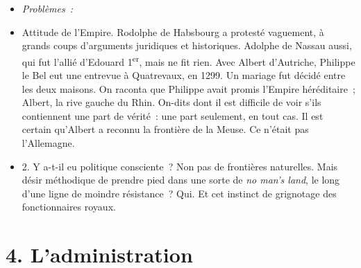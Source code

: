 \documentclass[french,twoside]{book} %
\newlength{\listmod}
\newcommand{\listhead}[1]{\hspace{-1\listmod}\emph{#1}}
\newcommand\chapteropen{} %
\newcommand\chaptercont{} %
\newcommand\chapterclose{} %
\begin{document}
\begin{enumerate}[itemsep=\baselineskip,]
\begin{itemize}[itemsep=0pt,]
\item[]\listhead{Problèmes :}
\item Attitude de l’Empire. Rodolphe de Habsbourg a protesté vaguement, à grands coups d’arguments juridiques et historiques. Adolphe de Nassau aussi, qui fut l’allié d’Edouard 1\textsuperscript{er}, mais ne fit rien. Avec Albert d’Autriche, Philippe le Bel eut une entrevue à Quatrevaux, en 1299. Un mariage fut décidé entre les deux maisons. On raconta que Philippe avait promis l’Empire héréditaire ; Albert, la rive gauche du Rhin. On-dits dont il est difficile de voir s’ils contiennent une part de vérité : une part seulement, en tout cas. Il est certain qu’Albert a reconnu la frontière de la Meuse. Ce n’était pas l’Allemagne.
\item 2. Y a-t-il eu politique consciente ? Non pas de frontières naturelles. Mais désir méthodique de prendre pied dans une sorte de {\itshape no man’s land}, le long d’une ligne de moindre résistance ? Qui. Et cet instinct de grignotage des fonctionnaires royaux.
\end{itemize}

 
\end{enumerate}

\chapterclose


\chapteropen
\chapter[{4. L’administration}]{\textsc{4. }L’administration}
\label{c04}\renewcommand{\leftmark}{\textsc{4. }L’administration}


\chaptercont
\end{document}
